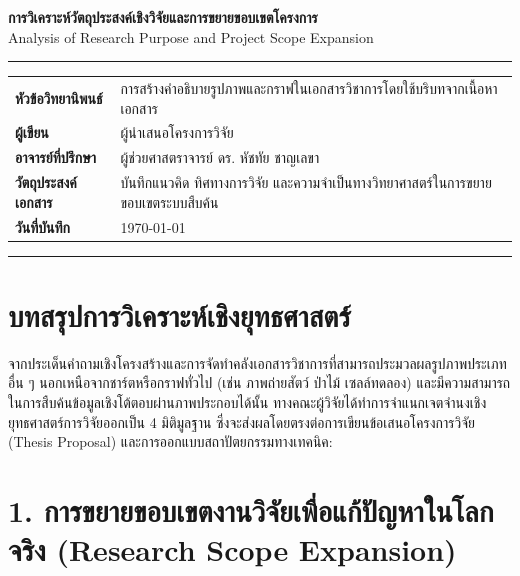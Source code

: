 \documentclass[10pt,a4paper]{article}
\begin{document}
\begin{center}
  {\Large \textbf{การวิเคราะห์วัตถุประสงค์เชิงวิจัยและการขยายขอบเขตโครงการ}}\\[6pt]
  {\color{muted}\small Analysis of Research Purpose and Project Scope Expansion}
\end{center}

\noindent\rule{\textwidth}{1.5pt}

\vspace{12pt}
\noindent
\begin{tabular}{@{}ll@{}}
  \textbf{หัวข้อวิทยานิพนธ์} & การสร้างคำอธิบายรูปภาพและกราฟในเอกสารวิชาการโดยใช้บริบทจากเนื้อหาเอกสาร \\
  \textbf{ผู้เขียน}          & ผู้นำเสนอโครงการวิจัย \\
  \textbf{อาจารย์ที่ปรึกษา}   & ผู้ช่วยศาสตราจารย์ ดร. หัชทัย ชาญเลขา \\
  \textbf{วัตถุประสงค์เอกสาร} & บันทึกแนวคิด ทิศทางการวิจัย และความจำเป็นทางวิทยาศาสตร์ในการขยายขอบเขตระบบสืบค้น \\
  \textbf{วันที่บันทึก}       & \today \\
\end{tabular}

\vspace{12pt}
\noindent\rule{\textwidth}{0.4pt}

\section*{บทสรุปการวิเคราะห์เชิงยุทธศาสตร์}

จากประเด็นคำถามเชิงโครงสร้างและการจัดทำคลังเอกสารวิชาการที่สามารถประมวลผลรูปภาพประเภทอื่น ๆ นอกเหนือจากชาร์ตหรือกราฟทั่วไป (เช่น ภาพถ่ายสัตว์ ป่าไม้ เซลล์ทดลอง) และมีความสามารถในการสืบค้นข้อมูลเชิงโต้ตอบผ่านภาพประกอบได้นั้น ทางคณะผู้วิจัยได้ทำการจำแนกเจตจำนงเชิงยุทธศาสตร์การวิจัยออกเป็น 4 มิติมูลฐาน ซึ่งจะส่งผลโดยตรงต่อการเขียนข้อเสนอโครงการวิจัย (Thesis Proposal) และการออกแบบสถาปัตยกรรมทางเทคนิค:

\vspace{12pt}

\section*{1. การขยายขอบเขตงานวิจัยเพื่อแก้ปัญหาในโลกจริง (Research Scope Expansion)}
\end{document}
